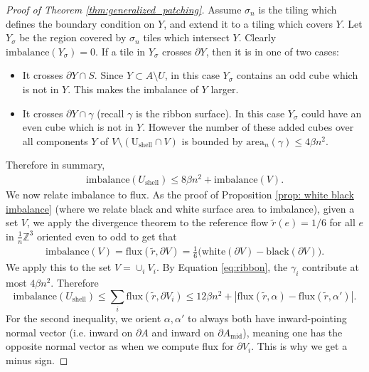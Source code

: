 \documentclass[10pt,a4paper]{amsart}
\newcommand{\m}[1]{\mathbb{#1}}
\begin{document}
\begin{proof}[Proof of Theorem \ref{thm:generalized_patching}]
    Assume $\sigma_n$ is the tiling which defines the boundary condition on $Y$, and extend it to a tiling which covers $Y$. Let $Y_\sigma$ be the region covered by $\sigma_n$ tiles which intersect $Y$. Clearly $\text{imbalance}(Y_\sigma) = 0$. If a tile in $Y_\sigma$ crosses $\partial Y$, then it is in one of two cases: 
    \begin{itemize}
        \item It crosses $\partial Y \cap S$. Since $Y\subset A\setminus U$, in this case $Y_\sigma$ contains an odd cube which is not in $Y$. This makes the imbalance of $Y$ larger. 
        \item It crosses $\partial Y \cap \gamma$ (recall $\gamma$ is the ribbon surface). In this case $Y_\sigma$ could have an even cube which is not in $Y$. However the number of these added cubes over all components $Y$ of $V\setminus (\text{U}_{\text{shell}}\cap V)$ is bounded by $\text{area}_n(\gamma) \leq 4\beta n^2$.
    \end{itemize}
    Therefore in summary,
    \begin{align*}
        \text{imbalance}(U_\text{shell}) \leq 8\beta n^2 + \text{imbalance}(V).
    \end{align*}
    We now relate imbalance to flux. As the proof of Proposition \ref{prop: white black imbalance} (where we relate black and white surface area to imbalance), given a set $V$, we apply the divergence theorem to the reference flow $\widetilde r(e) =1/6$ for all $e$ in $\frac{1}{n}\m Z^3$ oriented even to odd to get that 
    \begin{align*}
        \text{imbalance}(V) = \text{flux}(\widetilde r, \partial V) = \frac{1}{6}\bigg(\text{white}(\partial V)-\text{black}(\partial V)\bigg).
    \end{align*}
    We apply this to the set $V=\cup_i V_i$. By Equation \eqref{eq:ribbon}, the $\gamma_i$ contribute at most $4\beta n^2$. Therefore 
    \begin{equation}\label{eq:imbalance_as_flux_r}
        \text{imbalance}(U_\text{shell})  \leq \sum_i \text{flux}(\widetilde r, \partial V_i) \leq 12\beta n^2 + |\text{flux}(\widetilde r,\alpha) - \text{flux}(\widetilde r,\alpha')| .
    \end{equation}
    For the second inequality, we orient $\alpha,\alpha'$ to always both have inward-pointing normal vector (i.e. inward on $\partial A$ and inward on $\partial A_{\text{mid}}$), meaning one has the opposite normal vector as when we compute flux for $\partial V_i$. This is why we get a minus sign.     
    

\end{proof}
\end{document}

